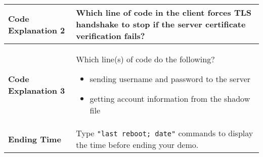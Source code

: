 \begin{longtable}{|p{}|p{}|}
 \textbf{Code Explanation 2} & 
	Which line of code in the client forces TLS handshake to stop if the server certificate
	verification fails?
 \\ 
 \hline

 \textbf{Code Explanation 3} & 
	Which line(s) of code do the following?
	\vspace*{0.2cm}
 	\begin{itemize}[topsep=-0.5cm,leftmargin=0.4cm]
		\item sending username and password to the server
		\item getting account information from the shadow file
	\end{itemize}
 \\ 
 \hline

 \textbf{Ending Time} & 
	Type \texttt{"last reboot; date"} commands to display the time before ending your demo.
 \\ 
 \hline

\end{longtable}
